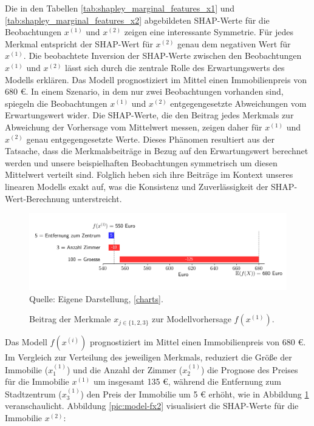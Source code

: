 Die in den Tabellen \ref{tab:shapley_marginal_features_x1} und \ref{tab:shapley_marginal_features_x2} 
abgebildeten SHAP-Werte für die Beobachtungen \( x^{(1)} \) und \( x^{(2)} \) zeigen eine interessante Symmetrie. 
Für jedes Merkmal entspricht der SHAP-Wert für \( x^{(2)} \) genau dem negativen Wert für \( x^{(1)} \). 
Die beobachtete Inversion der SHAP-Werte zwischen den Beobachtungen \( x^{(1)} \) und \( x^{(2)} \) 
lässt sich durch die zentrale Rolle des Erwartungswerts des Modells erklären. 
Das Modell prognostiziert im Mittel einen Immobilienpreis von 680 \euro. In einem Szenario, in dem nur zwei 
Beobachtungen vorhanden sind, spiegeln die Beobachtungen \( x^{(1)} \) und \( x^{(2)} \) entgegengesetzte 
Abweichungen vom Erwartungswert wider. Die SHAP-Werte, die den Beitrag jedes Merkmals zur Abweichung 
der Vorhersage vom Mittelwert messen, zeigen daher für \( x^{(1)} \) und \( x^{(2)} \) genau entgegengesetzte Werte. 
Dieses Phänomen resultiert aus der Tatsache, dass die Merkmalsbeiträge in Bezug auf den Erwartungswert 
berechnet werden und unsere beispielhaften Beobachtungen symmetrisch um diesen Mittelwert verteilt sind. 
Folglich heben sich ihre Beiträge im Kontext unseres linearen Modells exakt auf, was die Konsistenz und 
Zuverlässigkeit der SHAP-Wert-Berechnung unterstreicht.


\begin{figure}[!h]
    \caption{Beitrag der Merkmale $x_{j \in \{1, 2, 3\}}$ zur Modellvorhersage $f(x^{(1)})$.}
    \includegraphics[width=1\textwidth]{../scripts/images/model-output-x1.png}
    Quelle: Eigene Darstellung, \ref{charts}.
    \label{pic:model-fx1}
\end{figure}

Das Modell $f(x^{(i)})$
prognostiziert im Mittel einen Immobilienpreis von 680 \euro{}. Im Vergleich zur
Verteilung des jeweiligen Merkmals, reduziert die Größe der 
Immobilie ($x_1^{(1)}$) und die Anzahl der Zimmer ($x_2^{(1)}$) die Prognose 
des Preises für die Immobilie $x^{(1)}$ um insgesamt 135 \euro{}, während die Entfernung zum Stadtzentrum
($x_3^{(1)}$) den Preis der Immobilie um 5 \euro{} erhöht, wie in Abbildung 
\ref{pic:model-fx1} veranschaulicht. Abbildung \ref{pic:model-fx2} visualisiert die SHAP-Werte für die Immobilie $x^{(2)}$:

